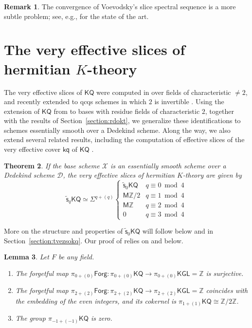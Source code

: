 \documentclass[11pt,hyp,english]{article}
\newcommand{\Z}{\mathbb{Z}}
\newcommand{\KGL}{\mathsf{KGL}}
\newcommand{\KQ}{\mathsf{KQ}}
\newcommand{\kq}{\mathsf{kq}}
\newcommand{\HZ}{\mathsf{M}\Z}
\newcommand{\vs}{\tilde{\mathsf{s}}}
\newcommand{\Forg}{\mathsf{Forg}}
\newtheorem{theorem}{Theorem}[section]
\newtheorem{lemma}[theorem]{Lemma}
\theoremstyle{definition}
\newtheorem{remark}[theorem]{Remark}
\begin{document}
\begin{remark}
The convergence of Voevodsky's slice spectral sequence is a more subtle problem;
see, e.g., 
\cite{BEO,zbMATH06220359,zbMATH07003144,zbMATH02078162} for the state of the art.
\end{remark}






\section{The very effective slices of hermitian $K$-theory}
\label{tvesohkt}
The very effective slices of $\KQ$ were computed in \cite[Theorem 16]{Bachmann} 
over fields of characteristic $\neq 2$, 
and recently extended to qcqs schemes in which $2$ is invertible 
\cite[Theorem 10.22]{bem.kglslices}. 
Using the extension of $\KQ$ from \cite{chn} to bases with residue fields of characteristic $2$, together with the results of Section~\ref{section:rdokt}, we generalize these identifications to schemes essentially smooth over a Dedekind scheme. Along the way, we also extend several related results, including the computation of effective slices of the very effective cover $\kq$ of $\KQ$ \cite{aro}.


\begin{theorem}
\label{BachmannKQ}
\label{thm:veff-KQ}
If the base scheme $\mathcal{X}$ is an essentially smooth scheme over a Dedekind scheme $\mathcal{D}$, 
the very effective slices of hermitian $K$-theory are given by 
\[
\vs_{q}\KQ
\simeq
\Sigma^{q+(q)}\begin{cases}
\vs_0\KQ & q \equiv 0 \bmod 4 \\
\HZ/2 & q \equiv 1 \bmod 4 \\
\HZ & q \equiv 2 \bmod 4 \\
0 & q \equiv 3 \bmod 4
\end{cases}
\]
\end{theorem}


More on the structure and properties of $\vs_0\KQ$ will follow below and in 
Section~\ref{section:tvezsokq}.
Our proof of  relies on  and 
 below.


\begin{lemma}\label{lem:low-degree-homotopy-sheaves-KQ}
Let $F$ be any field. 
\begin{enumerate}
    \item The forgetful map $\pi_{0+(0)}\Forg\colon \pi_{0+(0)}\KQ\to \pi_{0+(0)}\KGL = \Z$ is surjective.
    \item The forgetful map $\pi_{2+(2)}\Forg\colon \pi_{2+(2)}\KQ \to \pi_{2+(2)}\KGL=\Z$ coincides with the embedding of the even integers, and its cokernel is $\pi_{1+(1)}\KQ\cong \Z/2\Z$.
    \item The group $\pi_{-1+(-1)}\KQ$ is zero.
\end{enumerate}
\end{lemma}
\end{document}
